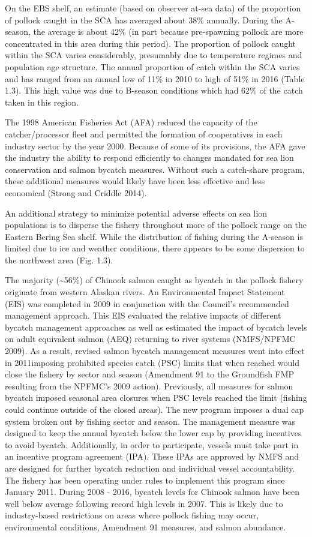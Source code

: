 On the EBS shelf, an estimate (based on observer at-sea data) of the
proportion of pollock caught in the SCA has averaged about 38\%
annually. During the A-season, the average is about 42\% (in part
because pre-spawning pollock are more concentrated in this area during
this period). The proportion of pollock caught within the SCA varies
considerably, presumably due to temperature regimes and population age
structure. The annual proportion of catch within the SCA varies and has
ranged from an annual low of 11\% in 2010 to high of 51\% in 2016 (Table
1.3). This high value was due to B-season conditions which had 62\% of
the catch taken in this region.

The 1998 American Fisheries Act (AFA) reduced the capacity of the
catcher/processor fleet and permitted the formation of cooperatives in
each industry sector by the year 2000. Because of some of its
provisions, the AFA gave the industry the ability to respond efficiently
to changes mandated for sea lion conservation and salmon bycatch
measures. Without such a catch-share program, these additional measures
would likely have been less effective and less economical (Strong and
Criddle 2014).

An additional strategy to minimize potential adverse effects on sea lion
populations is to disperse the fishery throughout more of the pollock
range on the Eastern Bering Sea shelf. While the distribution of fishing
during the A-season is limited due to ice and weather conditions, there
appears to be some dispersion to the northwest area (Fig. 1.3).

The majority (\textasciitilde{}56\%) of Chinook salmon caught as bycatch
in the pollock fishery originate from western Alaskan rivers. An
Environmental Impact Statement (EIS) was completed in 2009 in
conjunction with the Council's recommended management approach. This EIS
evaluated the relative impacts of different bycatch management
approaches as well as estimated the impact of bycatch levels on adult
equivalent salmon (AEQ) returning to river systems (NMFS/NPFMC 2009). As
a result, revised salmon bycatch management measures went into effect in
2011imposing prohibited species catch (PSC) limits that when reached
would close the fishery by sector and season (Amendment 91 to the
Groundfish FMP resulting from the NPFMC's 2009 action). Previously, all
measures for salmon bycatch imposed seasonal area closures when PSC
levels reached the limit (fishing could continue outside of the closed
areas). The new program imposes a dual cap system broken out by fishing
sector and season. The management measure was designed to keep the
annual bycatch below the lower cap by providing incentives to avoid
bycatch. Additionally, in order to participate, vessels must take part
in an incentive program agreement (IPA). These IPAs are approved by NMFS
and are designed for further bycatch reduction and individual vessel
accountability. The fishery has been operating under rules to implement
this program since January 2011. During 2008 - 2016, bycatch levels for
Chinook salmon have been well below average following record high levels
in 2007. This is likely due to industry-based restrictions on areas
where pollock fishing may occur, environmental conditions, Amendment 91
measures, and salmon abundance.


